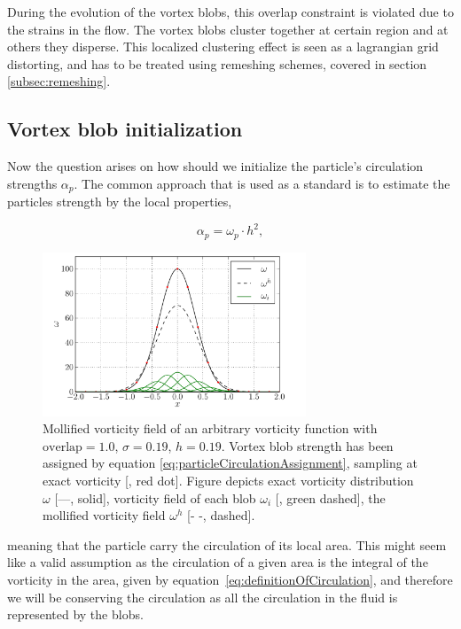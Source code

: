 During the evolution of the vortex blobs, this overlap constraint is violated due to the strains in the flow. The vortex blobs cluster together at certain region and at others they disperse. This localized clustering effect is seen as a lagrangian grid distorting, and has to be treated using remeshing schemes, covered in section \ref{subsec:remeshing}.


\subsection{Vortex blob initialization}
\label{subsec:vortexBlobInitialization}
Now the question arises on how should we initialize the particle's circulation strengths $\alpha_p$. The common approach that is used as a standard is to estimate the particles strength by the local properties,

	\begin{equation}
	\alpha_p = \omega_p\cdot h^2,
	\label{eq:particleCirculationAssignment}
	\end{equation}

	\begin{figure}[t]
	\centering
	\includegraphics[width=0.7\textwidth]{figures/lagrangian/particleInitialization.pdf}
	\caption{Mollified vorticity field of an arbitrary vorticity function with $\mathrm{overlap}=1.0$, $\sigma=0.19$, $h=0.19$. Vortex blob strength has been assigned by equation \ref{eq:particleCirculationAssignment}, sampling at exact vorticity [{\color{plotRed}{$\bullet$}}, red dot]. Figure depicts exact vorticity distribution $\omega$ [---, solid], vorticity field of each blob $\omega_i$ [{\color{darkgreen}{---}}, green dashed], the mollified vorticity field $\omega^h$ [- -, dashed].  }
	\label{fig:particleInitialization}
	\end{figure}

meaning that the particle carry the circulation of its local area. This might seem like a valid assumption as the circulation of a given area is the integral of the vorticity in the area, given by equation\ \ref{eq:definitionOfCirculation}, and therefore we will be conserving the circulation as all the circulation in the fluid is represented by the blobs.

